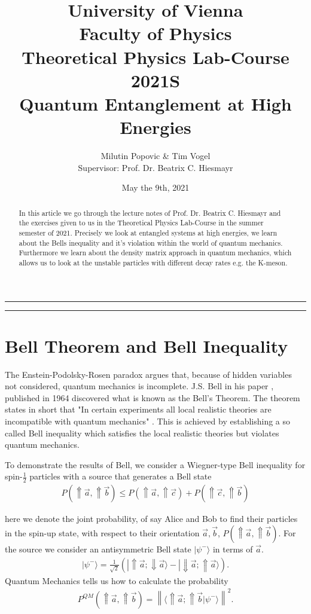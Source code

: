 \documentclass[a4paper]{article}
\title{University of Vienna\\ Faculty of Physics\\ \vspace{1.25cm} Theoretical Physics Lab-Course 2021S\\
Quantum Entanglement at High Energies}
\author{Milutin Popovic \& Tim Vogel \vspace{1cm}\\ Supervisor: Prof. Dr. Beatrix C.
Hiesmayr}
\date{May the 9th, 2021}
\begin{document}
\maketitle
\noindent\rule[0.5ex]{\linewidth}{1pt}
\begin{abstract}
In this article we go through the lecture notes of Prof. Dr. Beatrix C.
Hiesmayr and the exercises given to us in the Theoretical Physics Lab-Course
in the summer semester of  2021. Precisely  we look at entangled systems at high
energies, we learn about the Bells inequality and it's violation within the world
of quantum mechanics.
Furthermore we learn about the density matrix approach in quantum mechanics,
which allows us to look at the unstable particles with different decay rates
e.g. the K-meson.
\end{abstract}
\noindent\rule[0.5ex]{\linewidth}{1pt}

\tableofcontents

\section{Bell Theorem and Bell Inequality}
The Enstein-Podolsky-Rosen paradox argues that, because of hidden variables
not considered, quantum mechanics is incomplete. J.S. Bell in his paper \cite{bell},
published in 1964 discovered what is known as the Bell's Theorem. The theorem
states in short that "In certain experiments all local realistic theories are
incompatible with quantum mechanics" \cite{bell}. This is achieved by
establishing a so called Bell inequality which satisfies the local realistic
theories but violates quantum mechanics.

To demonstrate the results of Bell, we consider a Wiegner-type Bell inequality
for spin-$\frac{1}{2}$ particles with a source that generates a Bell state
\begin{align}\label{eq:wtb}
    P(\Uparrow \vec{a}, \Uparrow \vec{b}) \leq
    P(\Uparrow \vec{a}, \Uparrow \vec{c}) + P(\Uparrow \vec{c}, \Uparrow \vec{b})
\end{align}

here we denote the joint probability, of say Alice and Bob to find their
particles in the spin-up state, with respect to their orientation $\vec{a},
\vec{b}$, $P(\Uparrow \vec{a}, \Uparrow \vec{b})$. For the source we consider
an antisymmetric Bell state $|\psi ^-\rangle$ in terms of $\vec{a}$.
\begin{align}
    |\psi ^-\rangle = \frac{1}{\sqrt{2}}(|\Uparrow \vec{a}; \Downarrow
    \vec{a}\rangle - |\Downarrow \vec{a}; \Uparrow \vec{a}\rangle).
\end{align}
Quantum Mechanics tells us how to calculate the probability
\begin{align}\label{eq:prob}
    P^{QM}(\Uparrow \vec{a}, \Uparrow \vec{b}) = \left\|\langle\Uparrow \vec{a}; \Uparrow
    \vec{b}|\psi ^-\rangle \right\|^2.
\end{align}
\end{document}
